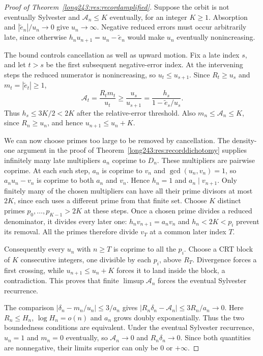 \documentclass[11pt]{article}
\begin{document}
\begin{proof}[Proof of Theorem~\ref{long243:res:recordamplified}]
Suppose the orbit is not eventually Sylvester and
$\mathcal A_n\le K$ eventually, for an integer $K\ge1$.
Absorption and $|\tilde e_n|/u_n\to0$ give $u_n\to\infty$.
Negative reduced errors must occur arbitrarily late, since otherwise
$h_nu_{n+1}=u_n-\tilde e_n$ would make $u_n$ eventually nonincreasing.

The bound controls cancellation as well as upward motion. Fix a late
index $s$, and let $t>s$ be the first subsequent negative-error index.
At the intervening steps the reduced numerator is nonincreasing, so
$u_t\le u_{s+1}$. Since $R_t\ge u_s$ and
$m_t=|\tilde e_t|\ge1$,
\[
 \mathcal A_t=\frac{R_tm_t}{u_t}\ge\frac{u_s}{u_{s+1}}
 =\frac{h_s}{1-\tilde e_s/u_s}.
\]
Thus $h_s\le3K/2<2K$ after the relative-error threshold.
Also $m_n\le\mathcal A_n\le K$, since $R_n\ge u_n$, and hence
$u_{n+1}\le u_n+K$.

We can now choose primes too large to be removed by cancellation.
The density-one argument in the proof of
Theorem~\ref{long243:res:recorddichotomy} supplies infinitely many
late multipliers $a_n$ coprime to $D_n$. These multipliers are pairwise
coprime. At each such step, $a_n$ is coprime to $v_n$ and
$\gcd(u_n,v_n)=1$, so $a_nu_n-v_n$ is coprime to both $a_n$ and $v_n$.
Hence $h_n=1$ and $a_n\mid v_{n+1}$.
Only finitely many of the chosen multipliers can have all their prime
divisors at most $2K$, since each uses a different prime from that finite
set. Choose $K$ distinct primes $p_0,\ldots,p_{K-1}>2K$ at these
steps. Once a chosen prime divides a reduced denominator, it divides
every later one: $h_nv_{n+1}=a_nv_n$ and $h_n<2K<p_i$ prevent its
removal. All the primes therefore divide $v_T$ at a common later index $T$.

Consequently every $u_n$ with $n\ge T$
is coprime to all the $p_i$. Choose a CRT block of $K$ consecutive
integers, one divisible by each $p_i$, above $R_T$.
Divergence forces a first crossing, while
$u_{n+1}\le u_n+K$ forces it to land inside the block, a contradiction.
This proves that finite $\limsup\mathcal A_n$ forces the eventual Sylvester recurrence.

The comparison
$|\delta_n-m_n/u_n|\le3/a_n$ gives
$|R_n\delta_n-\mathcal A_n|\le3R_n/a_n\to0$.
Here $R_n\le H_n$, $\log H_n=o(n)$ and $a_n$ grows doubly
exponentially. Thus the two boundedness conditions are equivalent.
Under the eventual Sylvester recurrence, $u_n=1$ and $m_n=0$ eventually, so
$\mathcal A_n\to0$ and $R_n\delta_n\to0$. Since both quantities are
nonnegative, their limits superior can only be $0$ or $+\infty$.
\end{proof}
\end{document}
